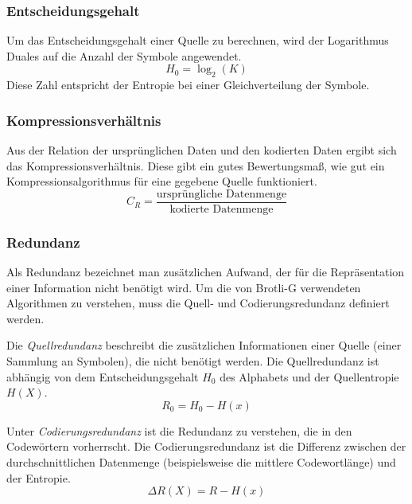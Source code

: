 \subsubsection*{Entscheidungsgehalt}
Um das Entscheidungsgehalt einer Quelle zu berechnen, wird der Logarithmus Duales auf die Anzahl der Symbole angewendet.
\begin{equation*}
H_0 = \log_2 (K)
\end{equation*}
Diese Zahl entspricht der Entropie bei einer Gleichverteilung der Symbole.

\subsubsection*{Kompressionsverhältnis}
Aus der Relation der ursprünglichen Daten und den kodierten Daten ergibt sich das Kompressionsverhältnis.
Diese gibt ein gutes Bewertungsmaß, wie gut ein Kompressionsalgorithmus für eine gegebene Quelle funktioniert.
\begin{equation*}
C_R = \frac{\text{ursprüngliche Datenmenge}}{\text{kodierte Datenmenge}}
\end{equation*}

\subsubsection*{Redundanz}
Als Redundanz bezeichnet man zusätzlichen Aufwand, der für die Repräsentation einer Information nicht benötigt wird.
Um die von Brotli-G verwendeten Algorithmen zu verstehen, muss die Quell- und Codierungsredundanz definiert werden.

Die \textit{Quellredundanz} beschreibt die zusätzlichen Informationen einer Quelle (einer Sammlung an Symbolen), die nicht benötigt werden.
Die Quellredundanz ist abhängig von dem Entscheidungsgehalt $\mathit{H_0}$ des Alphabets und der Quellentropie $\mathit{H(X)}$.
\begin{equation*}
R_0 = H_0 - H(x)
\end{equation*}

Unter \textit{Codierungsredundanz} ist die Redundanz zu verstehen, die in den Codewörtern vorherrscht.
Die Codierungsredundanz ist die Differenz zwischen der durchschnittlichen Datenmenge (beispielsweise die mittlere Codewortlänge) und der Entropie.
\begin{equation*}
\Delta R(X) = R - H(x)
\end{equation*}

\cite{Strutz2009}
